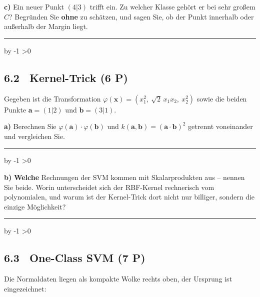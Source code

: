 \documentclass[10pt,a4paper]{article}
\newcommand{\antwortlinien}[1]{%
  \par\vspace{2pt}%
  \newcount\zeilen \zeilen=#1
  \loop
    \noindent\rule{\linewidth}{0.4pt}\par\vspace{11pt}%
    \advance\zeilen by -1
  \ifnum\zeilen>0 \repeat
}
\newcommand{\pkt}[1]{\hfill\textbf{(#1 P)}}
\begin{document}
\textbf{c)} Ein neuer Punkt $(4|3)$ trifft ein. Zu welcher Klasse gehört er bei sehr großem $C$?
Begründen Sie \textbf{ohne} zu schätzen, und sagen Sie, ob der Punkt innerhalb oder außerhalb der
Margin liegt.
\antwortlinien{3}

\subsection*{6.2 \ Kernel-Trick \pkt{6}}

Gegeben ist die Transformation
$\varphi(\boldsymbol{x}) = \left(x_1^2,\ \sqrt{2}\,x_1x_2,\ x_2^2\right)$
sowie die beiden Punkte $\boldsymbol{a} = (1|2)$ und $\boldsymbol{b} = (3|1)$.

\textbf{a)} Berechnen Sie $\varphi(\boldsymbol{a}) \cdot \varphi(\boldsymbol{b})$ und
$k(\boldsymbol{a}, \boldsymbol{b}) = (\boldsymbol{a} \cdot \boldsymbol{b})^2$ getrennt voneinander
und vergleichen Sie.
\antwortlinien{4}

\textbf{b)} \textbf{Welche} Rechnungen der SVM kommen mit Skalarprodukten aus -- nennen Sie beide.
Worin unterscheidet sich der RBF-Kernel rechnerisch vom polynomialen, und warum ist der
Kernel-Trick dort nicht nur billiger, sondern die einzige Möglichkeit?
\antwortlinien{5}

\subsection*{6.3 \ One-Class SVM \pkt{7}}

Die Normaldaten liegen als kompakte Wolke rechts oben, der Ursprung ist eingezeichnet:

\begin{center}
\end{center}
\end{document}
